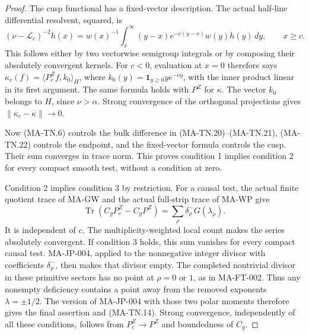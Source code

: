 \begin{proof}
The cusp functional has a fixed-vector description.
The actual half-line differential resolvent, squared, is
\[
 (\nu-\mathcal L_c)^{-2}h(x)
   =w(x)^{-1}\int_x^\infty
                  (y-x)e^{-\nu(y-x)}w(y)h(y)\,dy ,
       \qquad x\ge c .
 \tag{MA-TN.23}
\]
This follows either by two vectorwise semigroup integrals
or by composing their absolutely convergent kernels.
For \(c<0\), evaluation at \(x=0\) therefore says
\(\kappa_c(f)=\langle P_c^Zf,k_0\rangle_H\), where
\(k_0(y)=\mathbf1_{y\ge0}y e^{-\nu y}\), with the
inner product linear in its first argument.
The same formula holds with \(P^Z\) for \(\kappa\).
The vector \(k_0\) belongs to \(H\), since \(\nu>\alpha\).
Strong convergence of the orthogonal projections gives
\(\|\kappa_c-\kappa\|\to0\).

Now (MA-TN.6) controls the bulk difference in
(MA-TN.20)--(MA-TN.21), (MA-TN.22) controls the endpoint,
and the fixed-vector formula controls the cusp.
Their sum converges in trace norm.  This proves
condition 1 implies condition 2 for every compact smooth
test, without a condition at zero.

Condition 2 implies condition 3 by restriction.
For a causal test, the actual finite quotient trace
of MA-GW and the actual full-strip trace of MA-WP give
\[
 \operatorname{Tr}(C_gP_c^Z-C_gP^Z)
                     =\sum_\rho\delta_\rho^-G(\lambda_\rho).
 \tag{MA-TN.24}
\]
It is independent of \(c\).  The multiplicity-weighted
local count makes the series absolutely convergent.
If condition 3 holds, this sum vanishes for every
compact causal test.  MA-JP-004, applied to the
nonnegative integer divisor with coefficients
\(\delta_\rho^-\), then makes that divisor empty.
The completed nontrivial divisor in these primitive sectors
has no point at \(\rho=0\) or \(1\), as in MA-FT-002.
Thus any nonempty deficiency contains a point away from
the removed exponents \(\lambda=\pm1/2\).
The version of MA-JP-004 with those two polar moments
therefore gives the final assertion and (MA-TN.14).
Strong convergence, independently of
all these conditions, follows from \(P_c^Z\to P^Z\)
and boundedness of \(C_g\).
\end{proof}

